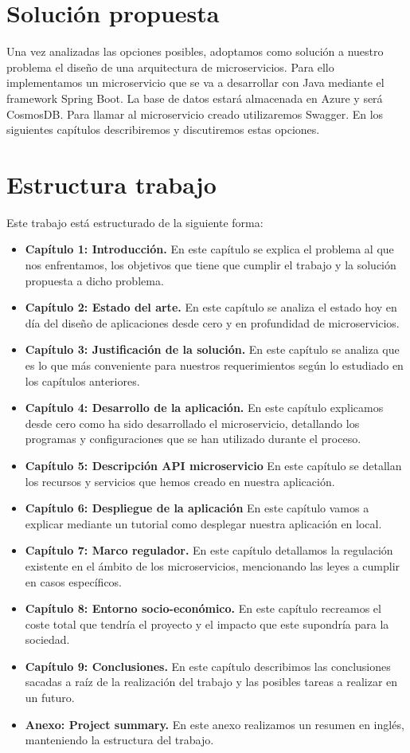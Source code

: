\documentclass[12pt]{report} %
\begin{document}
	
	\section{Solución propuesta}
	Una vez analizadas las opciones posibles, adoptamos como solución a nuestro problema el diseño de una arquitectura de microservicios.
	Para ello implementamos un microservicio que se va a desarrollar con Java mediante el framework Spring Boot.
	La base de datos estará almacenada en Azure y será CosmosDB.
	Para llamar al microservicio creado utilizaremos Swagger. En los siguientes capítulos describiremos y discutiremos estas opciones.
	
	\section{Estructura trabajo}
	Este trabajo está estructurado de la siguiente forma:
	
	\begin{itemize}
		\item \textbf{Capítulo 1: Introducción.} En este capítulo se explica el problema al que nos enfrentamos, los objetivos que tiene que cumplir el trabajo y la solución propuesta a dicho problema.
		\item  \textbf{Capítulo 2: Estado del arte.}  En este capítulo se analiza el estado hoy en día  del diseño de aplicaciones desde cero y en profundidad de microservicios.
		\item  \textbf{Capítulo 3: Justificación de la solución.} En este capítulo se analiza que es lo que más conveniente para nuestros requerimientos según lo estudiado en los capítulos anteriores.
		\item  \textbf{Capítulo 4: Desarrollo de la aplicación.} En este capítulo explicamos desde cero como ha sido desarrollado el microservicio, detallando los programas y configuraciones que se han utilizado durante el proceso. 
		\item  \textbf{Capítulo 5: Descripción API microservicio} En este capítulo se detallan los recursos y servicios que hemos creado en nuestra aplicación.
		\item  \textbf{Capítulo 6: Despliegue de la aplicación} En este capítulo vamos a explicar mediante un tutorial como desplegar nuestra aplicación en local.
		\item  \textbf{Capítulo 7: Marco regulador.} En este capítulo detallamos la regulación existente en el ámbito de los microservicios, mencionando las leyes a cumplir en casos específicos.
		\item  \textbf{Capítulo 8: Entorno socio-económico.} En este capítulo recreamos el coste total que tendría el proyecto y el impacto que este supondría para la sociedad.
		\item  \textbf{Capítulo 9: Conclusiones.} En este capítulo describimos las conclusiones sacadas a raíz de la realización del trabajo y las posibles tareas a realizar en un futuro.
		\item  \textbf{Anexo: Project summary.} En este anexo realizamos un resumen en inglés, manteniendo la estructura del trabajo.

	\end{itemize}
\end{document}
